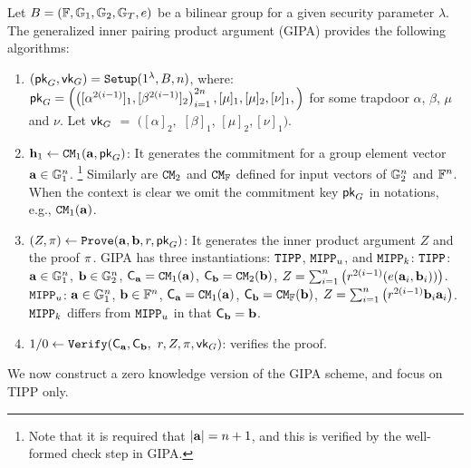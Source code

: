 \begin{definition} \cite{Bunz21}
    Let $B=(\mathbb{F},{\mathbb{G}}_1,{\mathbb{G}}_2,{\mathbb{G}}_T,e)$ be a bilinear group for a given security
parameter $\lambda$. The generalized inner pairing product argument (GIPA)
provides the following algorithms: 
\begin{enumerate}
\item
$(\mathsf{pk}_G, \mathsf{vk}_G) = \texttt{Setup}(1^\lambda,B,n)$, where: \newline
$\mathsf{pk}_G = \left(\left([\alpha^{2(i-1)}]_1, 
[\beta^{2(i-1)}]_2\right)_{i=1}^{2n}, [\mu]_1, [\mu]_2, [\nu]_1,
\right)$ for some trapdoor $\alpha$, $\beta$, 
$\mu$ and $\nu$.
Let $\mathsf{vk}_G$ $=$ $([\alpha]_2,$ $[\beta]_1$, $[\mu]_2, [\nu]_1)$.
\item 
${{\bf{\mathbf h}}}_1 \leftarrow {\mathtt{CM}}_1({{\mathbf {a}}}, \mathsf{pk}_G)$: \newline
It generates the commitment
for a group element vector ${{\mathbf {a}}} \in {\mathbb{G}}_1^{n}$.
\footnote{Note that it is required that $|{{\mathbf {a}}}|=n+1$, and
this is verified by the well-formed check step in GIPA.}
Similarly are ${\mathtt{CM}}_2$ and ${\mathtt{CM}}_{\mathbb{F}}$ defined for input vectors
of ${\mathbb{G}}_2^n$ and $\mathbb{F}^n$.
When the context is clear we omit the commitment key
$\mathsf{pk}_G$ in notations, e.g., ${\mathtt{CM}}_1({{\mathbf {a}}})$.

\item $(Z, \pi) \leftarrow \texttt{Prove}({{\mathbf {a}}}, {{\mathbf {b}}}, r, \mathsf{pk}_G)$: \newline
It generates the inner product argument $Z$ and the proof $\pi$.
GIPA has three instantiations: ${\mathtt{TIPP}}$,
${\mathtt{MIPP}_u}$, and ${\mathtt{MIPP}_k}$: 
    ${\mathtt{TIPP}}$: ${{\mathbf {a}}} \in {\mathbb{G}}_1^{n}$, ${{\mathbf {b}}} \in {\mathbb{G}}_2^{n}$,
        ${\mathsf{C}}_{{{\mathbf {a}}}} = {\mathtt{CM}}_1({{\mathbf {a}}})$,
        ${\mathsf{C}}_{{{\mathbf {b}}}} = {\mathtt{CM}}_2({{\mathbf {b}}})$,
        $Z = \sum_{i=1}^{n}
            \left(r^{2(i-1)} (e({{\mathbf {a}}}_i,{{\mathbf {b}}}_i))\right)$.
    ${\mathtt{MIPP}_u}$: ${{\mathbf {a}}} \in {\mathbb{G}}_1^{n}$, ${{\mathbf {b}}} \in \mathbb{F}^{n}$,
        ${\mathsf{C}}_{{{\mathbf {a}}}} = {\mathtt{CM}}_1({{\mathbf {a}}})$,
        ${\mathsf{C}}_{{{\mathbf {b}}}} = {\mathtt{CM}}_{\mathbb{F}}({{\mathbf {b}}})$,
        $Z = \sum_{i=1}^{n} \left(r^{2(i-1)} {{\mathbf {b}}}_i {{\mathbf {a}}}_i \right)$.
        ${\mathtt{MIPP}_k}$ differs from ${\mathtt{MIPP}_u}$ in that
        ${\mathsf{C}}_{{{\mathbf {b}}}} = {{\mathbf {b}}}$.

\item $1/0 \leftarrow \texttt{Verify}({\mathsf{C}}_{{{\mathbf {a}}}}, {\mathsf{C}}_{{{\mathbf {b}}}},$ $r, Z, \pi, \mathsf{vk}_G)$: verifies the proof.

\end{enumerate}
\end{definition}

We now construct a zero knowledge version of the GIPA scheme,
and focus on TIPP only.


